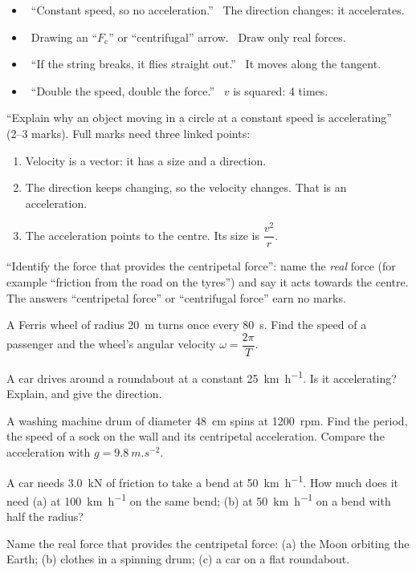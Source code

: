 \begin{mistakes}
\begin{itemize}
  \item \xmark\ ``Constant speed, so no acceleration.'' \cmark\ The direction changes: it accelerates.
  \item \xmark\ Drawing an ``$F_\mathrm{c}$'' or ``centrifugal'' arrow. \cmark\ Draw only real forces.
  \item \xmark\ ``If the string breaks, it flies straight out.'' \cmark\ It moves along the tangent.
  \item \xmark\ ``Double the speed, double the force.'' \cmark\ $v$ is squared: 4 times.
\end{itemize}
\end{mistakes}

\begin{examtip}
``Explain why an object moving in a circle at a constant speed is accelerating''
(2--3 marks). Full marks need three linked points:
\begin{enumerate}
  \item Velocity is a vector: it has a size and a direction.
  \item The direction keeps changing, so the velocity changes. That is an acceleration.
  \item The acceleration points to the centre. Its size is $\dfrac{v^2}{r}$.
\end{enumerate}
``Identify the force that provides the centripetal force'': name the \emph{real} force (for
example ``friction from the road on the tyres'') and say it acts towards the centre. The
answers ``centripetal force'' or ``centrifugal force'' earn no marks.
\end{examtip}

\begin{quickcheck}
  \item A Ferris wheel of radius \qty{20}{m} turns once every \qty{80}{s}. Find the speed
        of a passenger and the wheel's angular velocity $\omega = \dfrac{2\pi}{T}$.
  \item A car drives around a roundabout at a constant \qty{25}{km.h^{-1}}. Is it
        accelerating? Explain, and give the direction.
  \item A washing machine drum of diameter \qty{48}{cm} spins at \qty{1200}{rpm}. Find the
        period, the speed of a sock on the wall and its centripetal acceleration. Compare
        the acceleration with $g = \qty{9.8}{m.s^{-2}}$.
  \item A car needs \qty{3.0}{kN} of friction to take a bend at \qty{50}{km.h^{-1}}. How
        much does it need (a) at \qty{100}{km.h^{-1}} on the same bend; (b) at
        \qty{50}{km.h^{-1}} on a bend with half the radius?
  \item Name the real force that provides the centripetal force: (a) the Moon orbiting
        the Earth; (b) clothes in a spinning drum; (c) a car on a flat roundabout.
\end{quickcheck}

